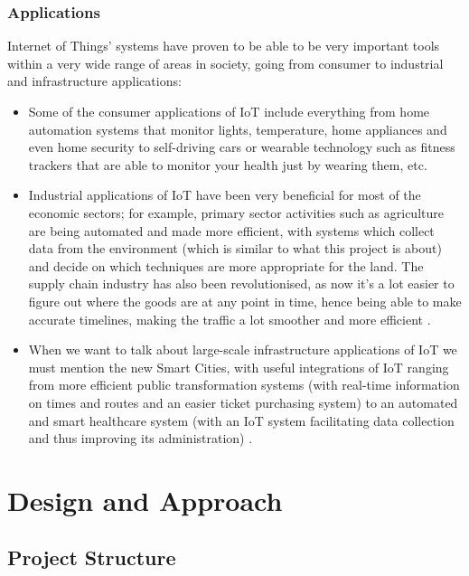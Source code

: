 \documentclass[12pt]{article}
\begin{document}
\subsubsection{Applications}

Internet of Things' systems have proven to be able to be very important tools within a very wide range of areas in society, going from consumer to industrial and infrastructure applications:

\begin{itemize}
    \item Some of the consumer applications of IoT include everything from home automation systems that monitor lights, temperature, home appliances and even home security to self-driving cars or wearable technology such as fitness trackers that are able to monitor your health just by wearing them, etc.
    \item Industrial applications of IoT have been very beneficial for most of the economic sectors; for example, primary sector activities such as agriculture are being automated and made more efficient, with systems which collect data from the environment (which is similar to what this project is about) and decide on which techniques are more appropriate for the land. The supply chain industry has also been revolutionised, as now it's a lot easier to figure out where the goods are at any point in time, hence being able to make accurate timelines, making the traffic a lot smoother and more efficient \cite{blume}. 
    \item When we want to talk about large-scale infrastructure applications of IoT we must mention the new Smart Cities, with useful integrations of IoT ranging from more efficient public transformation systems (with real-time information on times and routes and an easier ticket purchasing system) to an automated and smart healthcare system (with an IoT system facilitating data collection and thus improving its administration) \cite{chathuranga}.
\end{itemize}

\section{Design and Approach}

\subsection{Project Structure}
\end{document}

